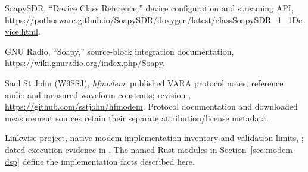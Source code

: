\documentclass[11pt,a4paper]{article}
\begin{document}
\begin{enumerate}[label={[\arabic*]}]
  \item SoapySDR, “Device Class Reference,” device configuration and streaming API, \url{https://pothosware.github.io/SoapySDR/doxygen/latest/classSoapySDR_1_1Device.html}.
  \item GNU Radio, “Soapy,” source-block integration documentation, \url{https://wiki.gnuradio.org/index.php/Soapy}.
  \item\label{ref:modem-protocol} Saul St John (W9SSJ), \emph{hfmodem}, published VARA protocol notes, reference audio and measured waveform constants; revision , \url{https://github.com/sstjohn/hfmodem}. Protocol documentation and downloaded measurement sources retain their separate attribution/license metadata.
  \item Linkwise project, native modem implementation inventory and validation limits, ; dated execution evidence in . The named Rust modules in Section~\ref{sec:modem-dsp} define the implementation facts described here.
\end{enumerate}
\end{document}
